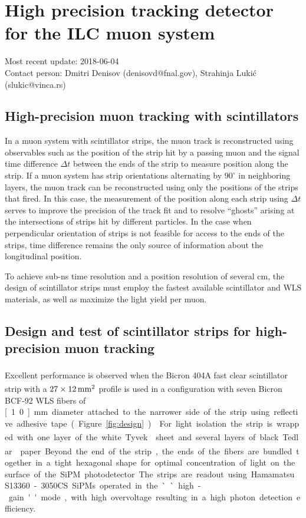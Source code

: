 \section{High precision tracking detector for the ILC muon system}
Most recent update: 2018-06-04 \\
Contact person: Dmitri Denisov (denisovd@fnal.gov), Strahinja Lukić (slukic@vinca.rs)

\subsection{High-precision muon tracking with scintillators}

In a muon system with scintillator strips, the muon track is reconstructed using observables such as the position of the strip hit by a passing muon and the signal time difference $\Delta t$ between the ends of the strip to measure position along the strip. If a muon system has strip orientations alternating by $90^{\circ}$ in neighboring layers, the muon track can be reconstructed using only the positions of the strips that fired. In this case, the measurement of the position along each strip using $\Delta t$ serves to improve the precision of the track fit and to resolve ``ghosts'' arising at the intersections of strips hit by different particles. In the case when perpendicular orientation of strips is not feasible for access to the ends of the strips, time difference remains the only source of information about the longitudinal position.

To achieve sub-ns time resolution and a position resolution of several cm, the design of scintillator strips must employ the fastest available scintillator and WLS materials, as well as maximize the light yield per muon.

\subsection{Design and test of scintillator strips for high-precision muon tracking}

Excellent performance is observed when the Bicron\textsuperscript{\textcopyright} 404A fast clear scintillator strip with a $27 \times \unit[12]{mm^2}$ profile is used in a configuration with seven Bicron\textsuperscript{\textcopyright} BCF-92 WLS fibers of \unit[1.0]{mm} diameter attached to the narrower side of the strip using reflective adhesive tape (Figure~\ref{fig:design}) \cite{Denisov2016120}. For light isolation the strip is wrapped with one layer of the white Tyvek\textsuperscript{\textregistered} sheet and several layers of black Tedlar\textsuperscript{\textregistered} paper. Beyond the end of the strip, the ends of the fibers are bundled together in a tight hexagonal shape for optimal concentration of light on the surface of the SiPM photodetector. The strips are readout using Hamamatsu S13360-3050CS SiPMs operated in the ``high-gain'' mode, with high overvoltage resulting in a high photon detection efficiency.

